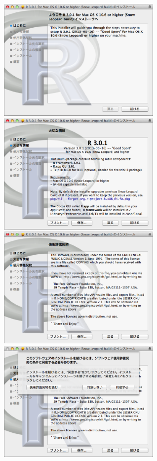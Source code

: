 \includegraphics[width=8cm]{img/osx/osx002.eps}\hspace{0.8em} \includegraphics[width=8cm]{img/osx/osx003.eps} \\

\includegraphics[width=8cm]{img/osx/osx004.eps}\hspace{0.8em} \includegraphics[width=8cm]{img/osx/osx005.eps}\\

